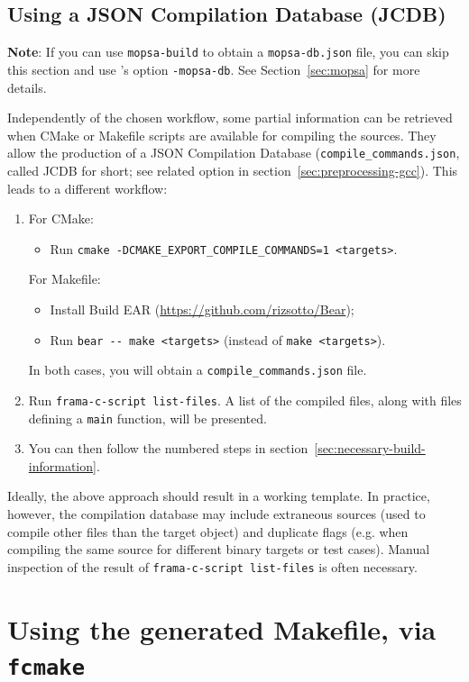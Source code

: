 \subsection{Using a JSON Compilation Database (JCDB)}
\label{sec:using-json-comp}

\textbf{Note}: If you can use \texttt{mopsa-build} to obtain a
\texttt{mopsa-db.json} file, you can skip this section and use \FramaC's option
\texttt{-mopsa-db}. See Section~\ref{sec:mopsa} for more details.

Independently of the chosen workflow, some partial information can be retrieved
when CMake or Makefile scripts are available for compiling the sources.
They allow the production of a JSON Compilation Database
(\texttt{compile\_commands.json}, called JCDB for short; see related option
in section~\ref{sec:preprocessing-gcc}). This leads to a different workflow:

\begin{enumerate}
\item For CMake:
  \begin{itemize}
  \item Run \texttt{cmake -DCMAKE\_EXPORT\_COMPILE\_COMMANDS=1 <targets>}.
  \end{itemize}
  For Makefile:
  \begin{itemize}
  \item Install Build EAR (\url{https://github.com/rizsotto/Bear});
  \item Run \verb|bear -- make <targets>| (instead of \texttt{make <targets>}).
  \end{itemize}
  In both cases, you will obtain a \texttt{compile\_commands.json} file.
\item Run \texttt{frama-c-script list-files}. A list of the compiled files,
  along with files defining a \texttt{main} function, will be presented.
\item You can then follow the numbered steps in
  section~\ref{sec:necessary-build-information}.
\end{enumerate}

Ideally, the above approach should result in a working template. In practice,
however, the compilation database may include extraneous sources
(used to compile other files than the target object) and duplicate flags
(e.g. when compiling the same source for different binary targets or test
cases). Manual inspection of the result of \texttt{frama-c-script list-files}
is often necessary.

\section{Using the generated Makefile, via \texttt{fcmake}}
\label{sec:using-generated-makefile}

